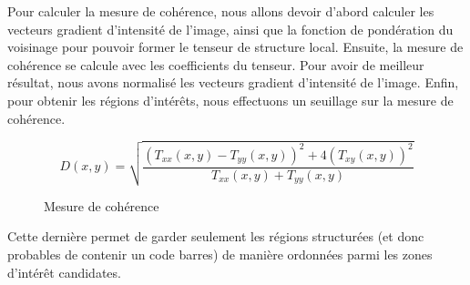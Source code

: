 \documentclass{rapport}
\begin{document}
Pour calculer la mesure de cohérence, nous allons devoir d'abord calculer les vecteurs gradient d'intensité de l'image, ainsi que la fonction de pondération du voisinage pour pouvoir former le tenseur de structure local. Ensuite, la mesure de cohérence se calcule avec les coefficients du tenseur. Pour avoir de meilleur résultat, nous avons normalisé les vecteurs gradient d'intensité de l'image. Enfin, pour obtenir les régions d’intérêts, nous effectuons un seuillage sur la mesure de cohérence.
\begin{figure}[h!]
\[
D(x, y) = \sqrt{\frac{\left(T_{xx}(x, y) - T_{yy}(x, y)\right)^2 + 4\left(T_{xy}(x, y)\right)^2}{T_{xx}(x, y) + T_{yy}(x, y)}}
\]
\caption{Mesure de cohérence}
\end{figure}
Cette dernière permet de garder seulement les régions structurées (et donc probables de contenir un code barres) de manière ordonnées parmi les zones d'intérêt candidates. 
\end{document}
